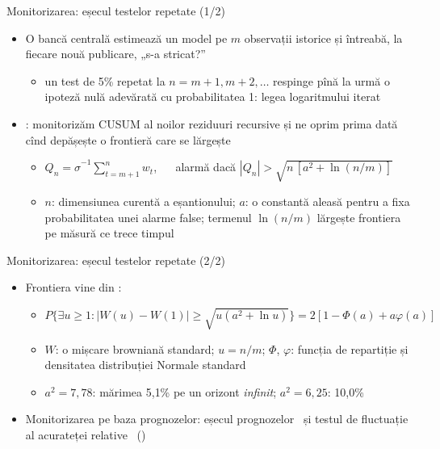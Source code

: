 \begin{frame}{Monitorizarea: eșecul testelor repetate (1/2)}
\itemsize{\small}
\begin{itemize}
    \item O bancă centrală estimează un model pe $m$ observații istorice și întreabă, la fiecare nouă publicare, „s-a stricat?”
    \begin{itemize}
        \item un test de 5\% repetat la $n = m + 1, m + 2, \dots$ respinge pînă la urmă o ipoteză nulă adevărată cu probabilitatea 1: legea logaritmului iterat
    \end{itemize}
    \item {}: monitorizăm CUSUM al noilor reziduuri recursive și ne oprim prima dată cînd depășește o frontieră care se lărgește
    \begin{itemize}
        \item $Q_n = \hat\sigma^{-1}\sum_{t = m+1}^{n} w_t$, $\quad$ alarmă dacă $|Q_n| > \sqrt{n\,[a^2 + \ln(n/m)]}$
        \item $n$: dimensiunea curentă a eșantionului; $a$: o constantă aleasă pentru a fixa probabilitatea unei alarme false; termenul $\ln(n/m)$ lărgește frontiera pe măsură ce trece timpul
    \end{itemize}
\end{itemize}
\end{frame}

\begin{frame}{Monitorizarea: eșecul testelor repetate (2/2)}
\itemsize{\small}
\begin{itemize}
    \item Frontiera vine din :
    \begin{itemize}
        \item $P\{\exists u \ge 1: |W(u) - W(1)| \ge \sqrt{u(a^2 + \ln u)}\} = 2[1 - \Phi(a) + a\varphi(a)]$
        \item $W$: o mișcare browniană standard; $u = n/m$; $\Phi$, $\varphi$: funcția de repartiție și densitatea distribuției Normale standard
        \item $a^2 = 7{,}78$: mărimea 5{,}1\% pe un orizont \emph{infinit}; $a^2 = 6{,}25$: 10{,}0\%
    \end{itemize}
    \item Monitorizarea pe baza prognozelor: eșecul prognozelor \ și testul de fluctuație al acurateței relative \ ()
\end{itemize}
\end{frame}

